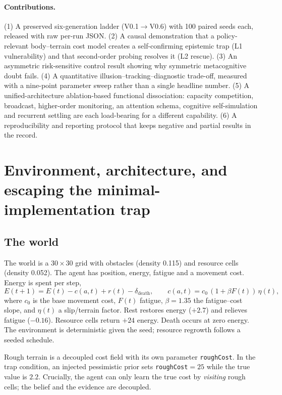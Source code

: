 \documentclass[11pt,a4paper]{article}
\begin{document}
\paragraph{Contributions.}
(1) A preserved six-generation ladder (V0.1$\rightarrow$V0.6) with 100 paired seeds each, released with raw per-run JSON. (2) A causal demonstration that a policy-relevant body--terrain cost model creates a self-confirming epistemic trap (L1 vulnerability) and that second-order probing resolves it (L2 rescue). (3) An asymmetric risk-sensitive control result showing why symmetric metacognitive doubt fails. (4) A quantitative illusion--tracking--diagnostic trade-off, measured with a nine-point parameter sweep rather than a single headline number. (5) A unified-architecture ablation-based functional dissociation: capacity competition, broadcast, higher-order monitoring, an attention schema, cognitive self-simulation and recurrent settling are each load-bearing for a different capability. (6) A reproducibility and reporting protocol that keeps negative and partial results in the record.

\section{Environment, architecture, and escaping the minimal-implementation trap}

\subsection{The world}

The world is a $30\times30$ grid with obstacles (density 0.115) and resource cells (density 0.052). The agent has position, energy, fatigue and a movement cost. Energy is spent per step,
\begin{equation}
E(t+1) = E(t) - c(a,t) + r(t) - \delta_{\mathrm{death}},
\qquad
c(a,t) = c_0\,(1+\beta F(t))\,\eta(t),
\end{equation}
where $c_0$ is the base movement cost, $F(t)$ fatigue, $\beta=1.35$ the fatigue--cost slope, and $\eta(t)$ a slip/terrain factor. Rest restores energy ($+2.7$) and relieves fatigue ($-0.16$). Resource cells return $+24$ energy. Death occurs at zero energy. The environment is deterministic given the seed; resource regrowth follows a seeded schedule.

Rough terrain is a decoupled cost field with its own parameter \texttt{roughCost}. In the trap condition, an injected pessimistic prior sets \texttt{roughCost}$=25$ while the true value is $2.2$. Crucially, the agent can only learn the true cost by \emph{visiting} rough cells; the belief and the evidence are decoupled.
\end{document}
